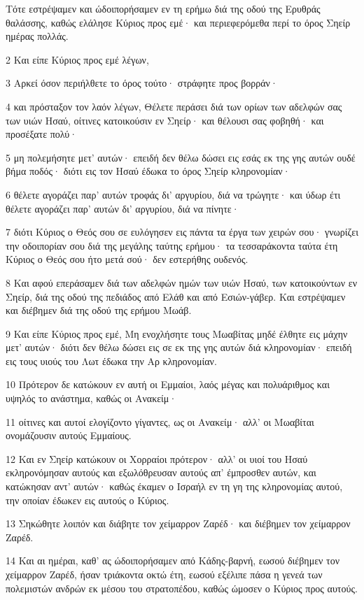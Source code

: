 \par Τότε εστρέψαμεν και ώδοιπορήσαμεν εν τη ερήμω διά της οδού της Ερυθράς θαλάσσης, καθώς ελάλησε Κύριος προς εμέ· και περιεφερόμεθα περί το όρος Σηείρ ημέρας πολλάς.
\par 2 Και είπε Κύριος προς εμέ λέγων,
\par 3 Αρκεί όσον περιήλθετε το όρος τούτο· στράφητε προς βορράν·
\par 4 και πρόσταξον τον λαόν λέγων, Θέλετε περάσει διά των ορίων των αδελφών σας των υιών Ησαύ, οίτινες κατοικούσιν εν Σηείρ· και θέλουσι σας φοβηθή· και προσέξατε πολύ·
\par 5 μη πολεμήσητε μετ' αυτών· επειδή δεν θέλω δώσει εις εσάς εκ της γης αυτών ουδέ βήμα ποδός· διότι εις τον Ησαύ έδωκα το όρος Σηείρ κληρονομίαν·
\par 6 θέλετε αγοράζει παρ' αυτών τροφάς δι' αργυρίου, διά να τρώγητε· και ύδωρ έτι θέλετε αγοράζει παρ' αυτών δι' αργυρίου, διά να πίνητε·
\par 7 διότι Κύριος ο Θεός σου σε ευλόγησεν εις πάντα τα έργα των χειρών σου· γνωρίζει την οδοιπορίαν σου διά της μεγάλης ταύτης ερήμου· τα τεσσαράκοντα ταύτα έτη Κύριος ο Θεός σου ήτο μετά σού· δεν εστερήθης ουδενός.
\par 8 Και αφού επεράσαμεν διά των αδελφών ημών των υιών Ησαύ, των κατοικούντων εν Σηείρ, διά της οδού της πεδιάδος από Ελάθ και από Εσιών-γάβερ. Και εστρέψαμεν και διέβημεν διά της οδού της ερήμου Μωάβ.
\par 9 Και είπε Κύριος προς εμέ, Μη ενοχλήσητε τους Μωαβίτας μηδέ έλθητε εις μάχην μετ' αυτών· διότι δεν θέλω δώσει εις σε εκ της γης αυτών διά κληρονομίαν· επειδή εις τους υιούς του Λωτ έδωκα την Αρ κληρονομίαν.
\par 10 Πρότερον δε κατώκουν εν αυτή οι Εμμαίοι, λαός μέγας και πολυάριθμος και υψηλός το ανάστημα, καθώς οι Ανακείμ·
\par 11 οίτινες και αυτοί ελογίζοντο γίγαντες, ως οι Ανακείμ· αλλ' οι Μωαβίται ονομάζουσιν αυτούς Εμμαίους.
\par 12 Και εν Σηείρ κατώκουν οι Χορραίοι πρότερον· αλλ' οι υιοί του Ησαύ εκληρονόμησαν αυτούς και εξωλόθρευσαν αυτούς απ' έμπροσθεν αυτών, και κατώκησαν αντ' αυτών· καθώς έκαμεν ο Ισραήλ εν τη γη της κληρονομίας αυτού, την οποίαν έδωκεν εις αυτούς ο Κύριος.
\par 13 Σηκώθητε λοιπόν και διάβητε τον χείμαρρον Ζαρέδ· και διέβημεν τον χείμαρρον Ζαρέδ.
\par 14 Και αι ημέραι, καθ' ας ώδοιπορήσαμεν από Κάδης-βαρνή, εωσού διέβημεν τον χείμαρρον Ζαρέδ, ήσαν τριάκοντα οκτώ έτη, εωσού εξέλιπε πάσα η γενεά των πολεμιστών ανδρών εκ μέσου του στρατοπέδου, καθώς ώμοσεν ο Κύριος προς αυτούς.
